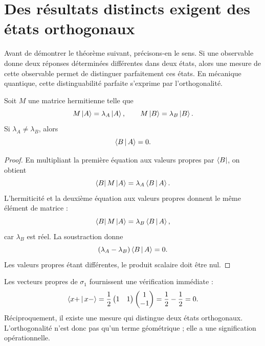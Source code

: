 \section{Des résultats distincts exigent des états orthogonaux}

Avant de démontrer le théorème suivant, précisons-en le sens. Si une observable donne deux réponses déterminées différentes dans deux états, alors une mesure de cette observable permet de distinguer parfaitement ces états. En mécanique quantique, cette distinguabilité parfaite s’exprime par l’orthogonalité.

\begin{theorem}
Soit \(M\) une matrice hermitienne telle que
\begin{equation}
  M\left\lvert A\right\rangle=\lambda_A\left\lvert A\right\rangle,
  \qquad
  M\left\lvert B\right\rangle=\lambda_B\left\lvert B\right\rangle.
\end{equation}
Si \(\lambda_A\ne\lambda_B\), alors
\begin{equation}
  \left\langle B\,\middle|\,A\right\rangle=0.
\end{equation}
\end{theorem}

\begin{proof}
En multipliant la première équation aux valeurs propres par \(\left\langle B\right\rvert\), on obtient
\begin{equation}
  \left\langle B\right\rvert M\left\lvert A\right\rangle=\lambda_A\left\langle B\,\middle|\,A\right\rangle.
\end{equation}
L’hermiticité et la deuxième équation aux valeurs propres donnent le même élément de matrice :
\begin{equation}
  \left\langle B\right\rvert M\left\lvert A\right\rangle=\lambda_B\left\langle B\,\middle|\,A\right\rangle,
\end{equation}
car \(\lambda_B\) est réel. La soustraction donne
\begin{equation}
  (\lambda_A-\lambda_B)\left\langle B\,\middle|\,A\right\rangle=0.
\end{equation}
Les valeurs propres étant différentes, le produit scalaire doit être nul.
\end{proof}

Les vecteurs propres de \(\sigma_1\) fournissent une vérification immédiate :
\begin{equation}
  \left\langle x+\,\middle|\,x-\right\rangle
  =
  \frac12
  \begin{pmatrix}1&1\end{pmatrix}
  \begin{pmatrix}1\\-1\end{pmatrix}
  =\frac12-\frac12=0.
\end{equation}
Réciproquement, il existe une mesure qui distingue deux états orthogonaux. L’orthogonalité n’est donc pas qu’un terme géométrique ; elle a une signification opérationnelle.

